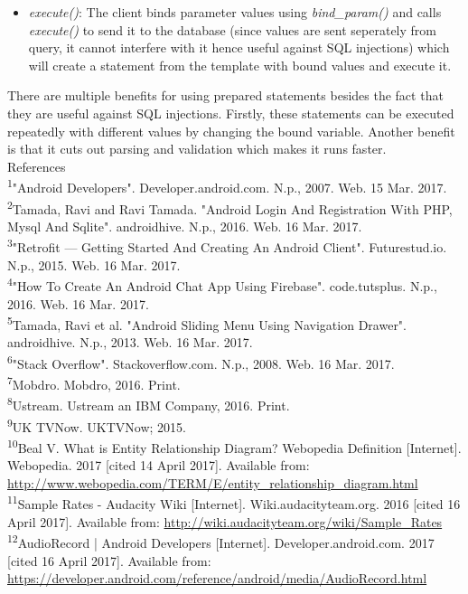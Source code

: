 \documentclass{article}
\begin{document}
\begin{flushleft}
\begin{itemize}
	\item \textit{execute()}: The client binds parameter values using \textit{bind_param()} and calls \textit{execute()} to send it to the database (since values are sent seperately from query, it cannot interfere with it hence useful against SQL injections) which will create a statement from the template with bound values and execute it.
\end{itemize}
There are multiple benefits for using prepared statements besides the fact that they are useful against SQL injections. Firstly, these statements can be executed repeatedly with different values by changing the bound variable. Another benefit is that it cuts out parsing and validation which makes it runs faster.\\
{\huge References}\\[0.5cm]
\textsuperscript{1}"Android Developers". Developer.android.com. N.p., 2007. Web. 15 Mar. 2017.\\
\textsuperscript{2}Tamada, Ravi and Ravi Tamada. "Android Login And Registration With PHP, Mysql And Sqlite". androidhive. N.p., 2016. Web. 16 Mar. 2017.\\
\textsuperscript{3}"Retrofit — Getting Started And Creating An Android Client". Futurestud.io. N.p., 2015. Web. 16 Mar. 2017.\\
\textsuperscript{4}"How To Create An Android Chat App Using Firebase". code.tutsplus. N.p., 2016. Web. 16 Mar. 2017.\\
\textsuperscript{5}Tamada, Ravi et al. "Android Sliding Menu Using Navigation Drawer". androidhive. N.p., 2013. Web. 16 Mar. 2017.\\
\textsuperscript{6}"Stack Overflow". Stackoverflow.com. N.p., 2008. Web. 16 Mar. 2017.\\
\textsuperscript{7}Mobdro. Mobdro, 2016. Print.\\
\textsuperscript{8}Ustream. Ustream an IBM Company, 2016. Print.\\
\textsuperscript{9}UK TVNow. UKTVNow; 2015. \\
\textsuperscript{10}Beal V. What is Entity Relationship Diagram? Webopedia Definition [Internet]. Webopedia. 2017 [cited 14 April 2017]. Available from: \url {http://www.webopedia.com/TERM/E/entity_relationship_diagram.html}\\
\textsuperscript{11}Sample Rates - Audacity Wiki [Internet]. Wiki.audacityteam.org. 2016 [cited 16 April 2017]. Available from: \url{http://wiki.audacityteam.org/wiki/Sample_Rates}\\
\textsuperscript{12}AudioRecord | Android Developers [Internet]. Developer.android.com. 2017 [cited 16 April 2017]. Available from: \url{https://developer.android.com/reference/android/media/AudioRecord.html}\\

\end{flushleft}
\end{document}
